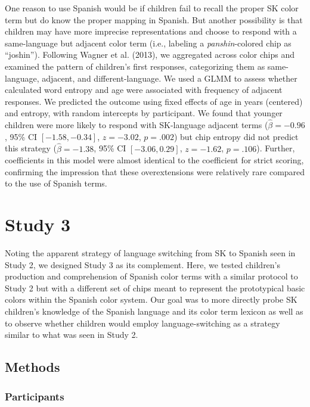 \documentclass[
  ,apa7,floatsintext]{apa6}
\begin{document}
One reason to use Spanish would be if children fail to recall the proper SK color term but do know the proper mapping in Spanish. But another possibility is that children may have more imprecise representations and choose to respond with a same-language but adjacent color term (i.e., labeling a \emph{panshin}-colored chip as ``joshin''). Following Wagner et al. (2013), we aggregated across color chips and examined the pattern of children's first responses, categorizing them as same-language, adjacent, and different-language. We used a GLMM to assess whether calculated word entropy and age were associated with frequency of adjacent responses. We predicted the outcome using fixed effects of age in years (centered) and entropy, with random intercepts by participant. We found that younger children were more likely to respond with SK-language adjacent terms (\(\hat{\beta} = -0.96\), 95\% CI \([-1.58, -0.34]\), \(z = -3.02\), \(p = .002\)) but chip entropy did not predict this strategy (\(\hat{\beta} = -1.38\), 95\% CI \([-3.06, 0.29]\), \(z = -1.62\), \(p = .106\)). Further, coefficients in this model were almost identical to the coefficient for strict scoring, confirming the impression that these overextensions were relatively rare compared to the use of Spanish terms.

\hypertarget{study-3}{%
\section{Study 3}\label{study-3}}

Noting the apparent strategy of language switching from SK to Spanish seen in Study 2, we designed Study 3 as its complement. Here, we tested children's production and comprehension of Spanish color terms with a similar protocol to Study 2 but with a different set of chips meant to represent the prototypical basic colors within the Spanish color system. Our goal was to more directly probe SK children's knowledge of the Spanish language and its color term lexicon as well as to observe whether children would employ language-switching as a strategy similar to what was seen in Study 2.

\hypertarget{methods-2}{%
\subsection{Methods}\label{methods-2}}

\hypertarget{participants-2}{%
\subsubsection{Participants}\label{participants-2}}
\end{document}
